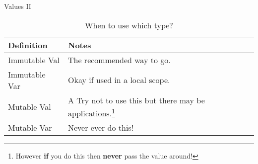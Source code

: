 \documentclass[10pt]{beamer}
\begin{document}
  \begin{frame}{Values II}
    \begin{table}
      \caption{When to use which type?}
      \begin{tabular}{@{} ll @{}}
	\toprule
	Definition & Notes\\
	\midrule
	Immutable Val & The recommended way to go.\\
	Immutable Var & Okay if used in a local scope.\\
	Mutable Val & A Try not to use this but there may be applications.\footnote{However \textbf{if} you do this then \textbf{never} pass the value around!}\\
	Mutable Var & \alert{Never ever do this!}\\
	\bottomrule
      \end{tabular}
    \end{table}
  \end{frame}
\end{document}
